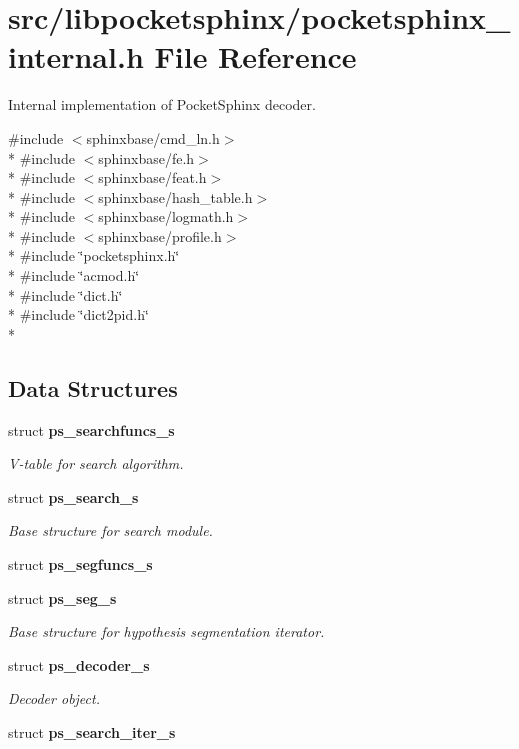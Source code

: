 \section{src/libpocketsphinx/pocketsphinx\+\_\+internal.h File Reference}
\label{pocketsphinx__internal_8h}


Internal implementation of Pocket\+Sphinx decoder.  


{\ttfamily \#include $<$sphinxbase/cmd\+\_\+ln.\+h$>$}\\*
{\ttfamily \#include $<$sphinxbase/fe.\+h$>$}\\*
{\ttfamily \#include $<$sphinxbase/feat.\+h$>$}\\*
{\ttfamily \#include $<$sphinxbase/hash\+\_\+table.\+h$>$}\\*
{\ttfamily \#include $<$sphinxbase/logmath.\+h$>$}\\*
{\ttfamily \#include $<$sphinxbase/profile.\+h$>$}\\*
{\ttfamily \#include \char`\"{}pocketsphinx.\+h\char`\"{}}\\*
{\ttfamily \#include \char`\"{}acmod.\+h\char`\"{}}\\*
{\ttfamily \#include \char`\"{}dict.\+h\char`\"{}}\\*
{\ttfamily \#include \char`\"{}dict2pid.\+h\char`\"{}}\\*
\subsection*{Data Structures}
\begin{DoxyCompactItemize}
\item 
struct {\bf ps\+\_\+searchfuncs\+\_\+s}
\begin{DoxyCompactList}\small\item\em V-\/table for search algorithm. \end{DoxyCompactList}\item 
struct {\bf ps\+\_\+search\+\_\+s}
\begin{DoxyCompactList}\small\item\em Base structure for search module. \end{DoxyCompactList}\item 
struct {\bf ps\+\_\+segfuncs\+\_\+s}
\item 
struct {\bf ps\+\_\+seg\+\_\+s}
\begin{DoxyCompactList}\small\item\em Base structure for hypothesis segmentation iterator. \end{DoxyCompactList}\item 
struct {\bf ps\+\_\+decoder\+\_\+s}
\begin{DoxyCompactList}\small\item\em Decoder object. \end{DoxyCompactList}\item 
struct {\bf ps\+\_\+search\+\_\+iter\+\_\+s}
\end{DoxyCompactItemize}
